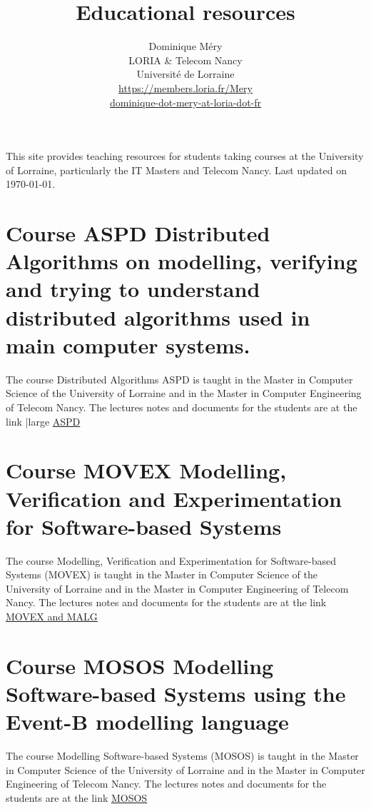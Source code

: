 \documentclass[ 12pt]{article}
\title{Educational resources}
\author{Dominique M\'ery\\
LORIA \& Telecom Nancy\\ Universit\'e de Lorraine\\
\url{https://members.loria.fr/Mery}\\ \url{dominique-dot-mery-at-loria-dot-fr}}
\begin{document}
  \setcounter{ex}{1}
\maketitle

This site provides teaching resources for students taking courses at
the University of Lorraine, particularly the IT Masters and Telecom
Nancy. {Last updated \now on \today}.




\section{ Course ASPD  Distributed Algorithms on modelling, verifying and trying to understand distributed algorithms used in  main  computer systems.}
\label{sec:course-movex}


The   course Distributed Algorithms ASPD is taught in
the Master  in Computer Science of the University of Lorraine  and in
the Master in Computer Engineering of Telecom Nancy. The  lectures
notes  and documents for the students  are  at the link {|large \href{https://mery54.github.io/teaching/aspd}{ASPD}}



\section{ Course MOVEX  Modelling, Verification  and Experimentation
  for  Software-based Systems}
\label{sec:course-movex}


The   course Modelling, Verification  and Experimentation
  for  Software-based Systems  (MOVEX) is taught in
the Master  in Computer Science of the University of Lorraine  and in
the Master in Computer Engineering of Telecom Nancy. The  lectures notes  and documents for the students  are  at the link
\href{https://mery54.github.io/teaching/movex}{MOVEX and MALG}



\section{ Course MOSOS Modelling Software-based Systems using  the
  Event-B modelling language}
\label{sec:course-mosos-modell}


The   course Modelling Software-based Systems (MOSOS) is taught in
the Master  in Computer Science of the University of Lorraine  and in
the Master in Computer Engineering of Telecom Nancy. The  lectures notes  and documents for the students  are  at the link
\href{https://mery54.github.io/teaching/mosos}{MOSOS}
\end{document}
